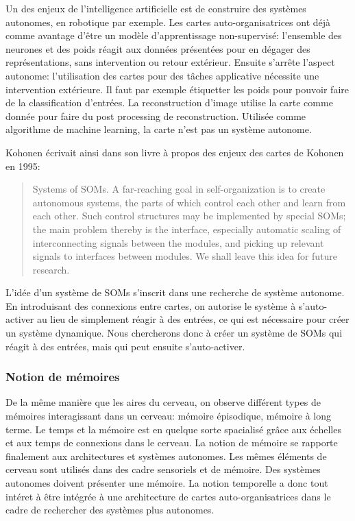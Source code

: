 \documentclass[../main]{subfiles}
\begin{document}
Un des enjeux de l'intelligence artificielle est de construire des systèmes autonomes, en robotique par exemple. Les cartes auto-organisatrices ont déjà comme avantage d'être un modèle d'apprentissage non-supervisé: l'ensemble des neurones et des poids réagit aux données présentées pour en dégager des représentations, sans intervention ou retour extérieur. Ensuite s'arrête l'aspect autonome: l'utilisation des cartes pour des tâches applicative nécessite une intervention extérieure. Il faut par exemple étiquetter les poids pour pouvoir faire de la classification d'entrées. La reconstruction d'image utilise la carte comme donnée pour faire du post processing de reconstruction. Utilisée comme algorithme de machine learning, la carte n'est pas un système autonome. 

Kohonen écrivait ainsi dans son livre à propos des enjeux des cartes de Kohonen en 1995:


\begin{quote}Systems of SOMs. A far-reaching goal in self-organization is to create
autonomous systems, the parts of which control each other and learn from
each other. Such control structures may be implemented by special SOMs;
the main problem thereby is the interface, especially automatic scaling of
interconnecting signals between the modules, and picking up relevant signals
to interfaces between modules. We shall leave this idea for future research. \cite{Kohonen1995SelfOrganizingM}
\end{quote}
L'idée d'un système de SOMs s'inscrit dans une recherche de système autonome. En introduisant des connexions entre cartes, on autorise le système à s'auto-activer au lieu de simplement réagir à des entrées, ce qui est nécessaire pour créer un système dynamique. Nous chercherons donc à créer un système de SOMs qui réagit à des entrées, mais qui peut ensuite s'auto-activer.

\subsubsection{Notion de mémoires}

De la même manière que les aires du cerveau, on observe différent types de mémoires interagissant dans un cerveau: mémoire épisodique, mémoire à long terme. Le temps et la mémoire est en quelque sorte spacialisé grâce aux échelles et aux temps de connexions dans le cerveau. 
La notion de mémoire se rapporte finalement aux architectures et systèmes autonomes. Les mêmes éléments de cerveau sont utilisés dans des cadre sensoriels et de mémoire. 
Des systèmes autonomes doivent présenter une mémoire. 
La notion temporelle a donc tout intéret à être intégrée à une architecture de cartes auto-organisatrices dans le cadre de rechercher des systèmes plus autonomes.
\end{document}
